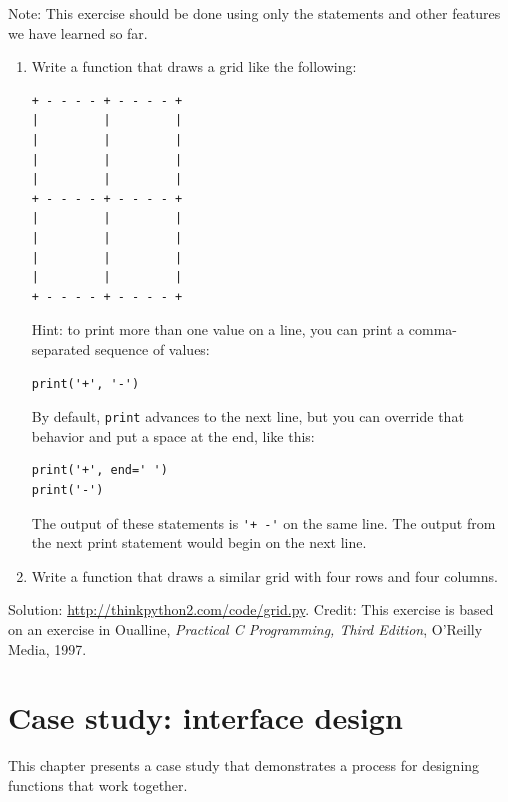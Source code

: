 \documentclass[10pt]{book}
\begin{document}
\begin{exercise}

Note: This exercise should be
done using only the statements and other features we have learned so
far.  

\begin{enumerate}

\item Write a function that draws a grid like the following:

\begin{verbatim}
+ - - - - + - - - - +
|         |         |
|         |         |
|         |         |
|         |         |
+ - - - - + - - - - +
|         |         |
|         |         |
|         |         |
|         |         |
+ - - - - + - - - - +
\end{verbatim}
%
Hint: to print more than one value on a line, you can print
a comma-separated sequence of values:

\begin{verbatim}
print('+', '-')
\end{verbatim}
%
By default, {\tt print} advances to the next line, but you
can override that behavior and put a space at the end, like this:

\begin{verbatim}
print('+', end=' ')
print('-')
\end{verbatim}
%
The output of these statements is \verb"'+ -'" on the same line.
The output from the next print statement would begin on the next line.

\item Write a function that draws a similar grid
with four rows and four columns.

\end{enumerate}

Solution: \url{http://thinkpython2.com/code/grid.py}.
Credit: This exercise is based on an exercise in Oualline, {\em
    Practical C Programming, Third Edition}, O'Reilly Media, 1997.

\end{exercise}





\chapter{Case study: interface design}
\label{turtlechap}

This chapter presents a case study that demonstrates a process for
designing functions that work together.
\end{document}
